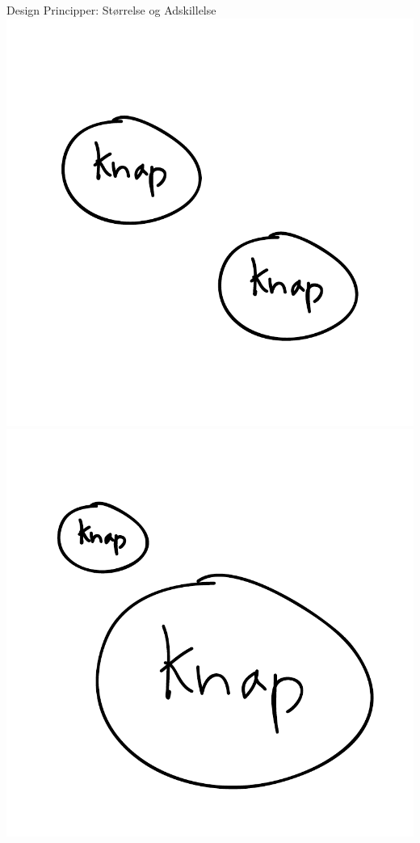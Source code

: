 \documentclass[10pt]{beamer}
\begin{document}
\begin{frame}{Design Principper: Størrelse og Adskillelse}
 \centering
	\includegraphics[scale=0.31]{img/sizeuden.pdf}\quad%
	\includegraphics[scale=0.31]{img/sizemed.pdf}\quad%

\end{frame}
\end{document}
